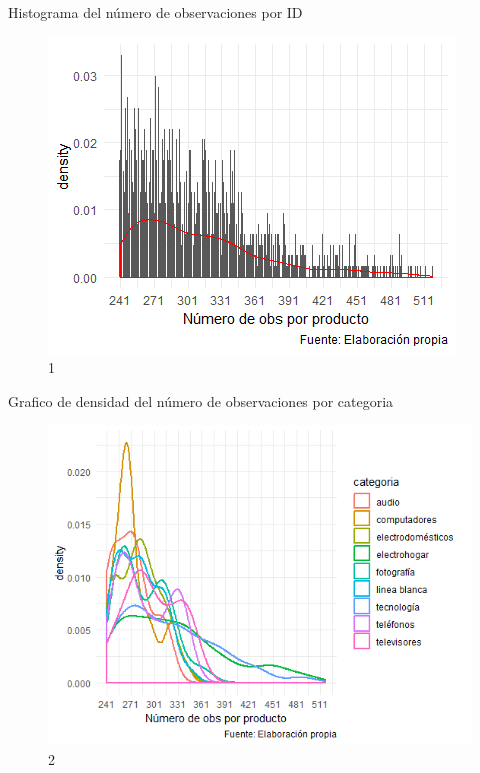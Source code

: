 \documentclass[xcolor=dvipsnames]{beamer}
\begin{document}
\begin{frame}
Histograma del n\'umero de observaciones por ID
\begin{figure}
\includegraphics[scale=0.75]{observaciones_producto.png}
\caption{1}
\end{figure}
\end{frame}

\begin{frame}
Grafico de densidad del n\'umero de observaciones por categoria
\begin{figure}
\includegraphics[scale=0.60]{observaciones_categoria.png}
\caption{2}
\end{figure}
\end{frame}
\end{document}
